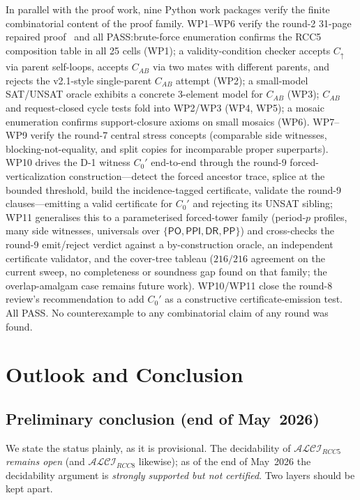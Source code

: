 \documentclass[
]{ceurart}
\theoremstyle{definition}
\newcommand{\ALCIRCC}[1]{\ensuremath{\mathcal{ALCI}_{\mathit{RCC#1}}}}
\newcommand{\DR}{\ensuremath{\mathsf{DR}}}
\newcommand{\PO}{\ensuremath{\mathsf{PO}}}
\newcommand{\PP}{\ensuremath{\mathsf{PP}}}
\newcommand{\PPI}{\ensuremath{\mathsf{PPI}}}
\begin{document}
In parallel with the proof work, nine Python work packages
verify the finite combinatorial content of the proof family.
WP1--WP6 verify the round-2 31-page repaired
proof~\cite{GPT55Repaired} and all PASS:\@ brute-force
enumeration confirms the RCC5 composition table in all 25
cells (WP1); a validity-condition checker accepts $C_\uparrow$
via parent self-loops, accepts $C_{AB}$ via two mates with
different parents, and rejects the v2.1-style single-parent
$C_{AB}$ attempt (WP2); a small-model SAT/UNSAT oracle exhibits
a concrete 3-element model for $C_{AB}$ (WP3); $C_{AB}$ and
request-closed cycle tests fold into WP2/WP3 (WP4, WP5); a
mosaic enumeration confirms support-closure axioms on small
mosaics (WP6).  WP7--WP9 verify the round-7 central stress
concepts (comparable side witnesses, blocking-not-equality, and
split copies for incomparable proper superparts).  WP10 drives the
D-1 witness $C_0'$ end-to-end through the round-9 forced-verticalization
construction---detect the forced ancestor trace, splice at the bounded
threshold, build the incidence-tagged certificate, validate the round-9
clauses---emitting a valid certificate for $C_0'$ and rejecting its
UNSAT sibling; WP11 generalises this to a parameterised forced-tower
family (period-$p$ profiles, many side witnesses, universals over
$\{\PO,\PPI,\DR,\PP\}$) and cross-checks the round-9 emit/reject verdict
against a by-construction oracle, an independent certificate validator,
and the cover-tree tableau ($216/216$ agreement on the current sweep,
no completeness or soundness gap found on that family; the
overlap-amalgam case remains future work).  WP10/WP11 close the
round-8 review's recommendation to add $C_0'$ as a constructive
certificate-emission test.  All PASS.  No counterexample to any
combinatorial claim of any round was found.

\section{Outlook and Conclusion}
\label{sec:outlook}

\subsection{Preliminary conclusion (end of May~2026)}
\label{ssec:prelim-conclusion}

We state the status plainly, as it is provisional.  The decidability of
$\ALCIRCC{5}$ \emph{remains open} (and $\ALCIRCC{8}$ likewise); as of the end of
May~2026 the decidability argument is \emph{strongly supported but not
certified}.  Two layers should be kept apart.
\end{document}
